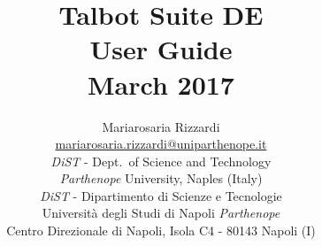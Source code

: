 \documentclass[a4paper,10pt]{report}%
\begin{document}
\pagestyle{empty} %


\title{{\Huge Talbot Suite DE} \\[.3in] {\Huge User Guide} \\[.6in]
       {\large March 2017} \\[.6in]}
\author{
{\Large Mariarosaria Rizzardi} \\[.3in]
{\href{mariarosaria.rizzardi@uniparthenope.it}{mariarosaria.rizzardi@uniparthenope.it}} \\[.3in]
{{\sl DiST} - Dept.~of Science and Technology} \\
{{\it Parthenope} University, Naples (Italy)} \\[2.25in]
{\small{\sl DiST} - Dipartimento di Scienze e Tecnologie} \\
{\small Universit\`a degli Studi di Napoli {\it Parthenope}} \\
{\small Centro Direzionale di Napoli, Isola C4 - 80143 Napoli (I)}
}
\date{} %


\clearpage\maketitle
\thispagestyle{empty} %





\newpage
\pagestyle{plain} %
\tableofcontents


\newpage
{} %
\setcounter{page}{1}

\end{document}
